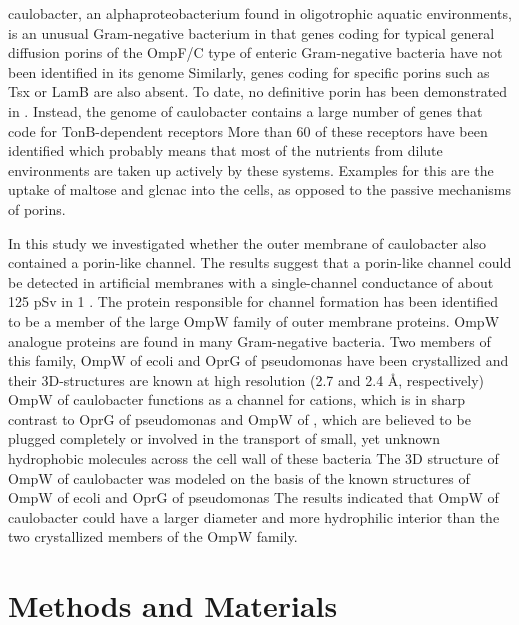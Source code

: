     \ac{caulobacter}, an alphaproteobacterium found in oligotrophic aquatic environments, is an unusual Gram-negative bacterium in that genes coding for typical general diffusion porins of the OmpF/C type of enteric Gram-negative bacteria have not been identified in its genome Similarly, genes coding for specific porins such as Tsx or LamB are also absent. To date, no definitive porin has been demonstrated in \caulobacter. Instead, the genome of \ac{caulobacter} contains a large number of genes that code for TonB-dependent receptors More than 60 of these receptors have been identified which probably means that most of the nutrients from dilute environments are taken up actively by these systems. Examples for this are the uptake of maltose and \ac{glcnac} into the cells, as opposed to the passive mechanisms of porins.

    In this study we investigated whether the outer membrane of \ac{caulobacter} also contained a porin-like channel. The results suggest that  a porin-like channel could be detected in artificial membranes with a single-channel conductance of about 125 \si{\pico\sievert} in 1 \si{\molar} . The protein responsible for channel formation has been identified to be a member of the large OmpW family of outer membrane proteins. OmpW analogue proteins are found in many Gram-negative bacteria. Two members of this family, OmpW of \ac{ecoli} and OprG of \ac{pseudomonas} have been crystallized and their 3D-structures are known at high resolution (2.7 and 2.4 \AA, respectively)  OmpW of \ac{caulobacter} functions as a channel for cations, which is in sharp contrast to OprG of \ac{pseudomonas} and OmpW of \ecoli, which are believed to be plugged completely or involved in the transport of small, yet unknown hydrophobic molecules across the cell wall of these bacteria The 3D structure of OmpW of \ac{caulobacter} was modeled on the basis of the known structures of OmpW of \ac{ecoli} and OprG of \ac{pseudomonas} The results indicated that OmpW of \ac{caulobacter} could have a larger diameter and more hydrophilic interior than the two crystallized members of the OmpW family.

\section{Methods and Materials}
\label{sec:porin_methods}
